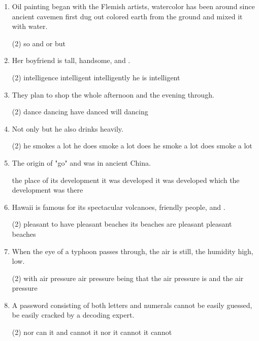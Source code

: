 \begin{enumerate}
\item Oil painting began with the Flemish artists, \ttu watercolor has been around since ancient cavemen first dug out colored earth from the ground and mixed it with water.
\begin{tasks}(2)
  \task so
  \task and
  \task or
  \task but
\end{tasks}

\item Her boyfriend is tall, handsome, and \ttu .
\begin{tasks}(2)
  \task intelligence
  \task intelligent
  \task intelligently
  \task he is intelligent
\end{tasks}

\item They plan to shop the whole afternoon and \ttu the evening through.
\begin{tasks}(2)
  \task dance
  \task dancing
  \task have danced
  \task will dancing
\end{tasks}

\item Not only \ttu but he also drinks heavily.
\begin{tasks}(2)
  \task he smokes a lot
  \task he does smoke a lot
  \task does he smoke a lot
  \task does smoke a lot
\end{tasks}

\item The origin of "go" and \ttu was in ancient China.
\begin{tasks}
  \task the place of its development
  \task it was developed
  \task it was developed which
  \task the development was there
\end{tasks}

\item Hawaii is famous for its spectacular volcanoes, friendly people, and \ttu.
\begin{tasks}(2)
  \task pleasant
  \task to have pleasant beaches
  \task its beaches are pleasant
  \task pleasant beaches
\end{tasks}

\item When the eye of a typhoon passes through, the air is still, the humidity high, \ttu low.
\begin{tasks}(2)
  \task with air pressure
  \task air pressure being
  \task that the air pressure is
  \task and the air pressure
\end{tasks}

\item A password consisting of both letters and numerals cannot be easily guessed, \ttu be easily cracked by a decoding expert.
\begin{tasks}(2)
  \task nor can it
  \task and cannot it
  \task nor it cannot
  \task it cannot
\end{tasks}


\end{enumerate}
